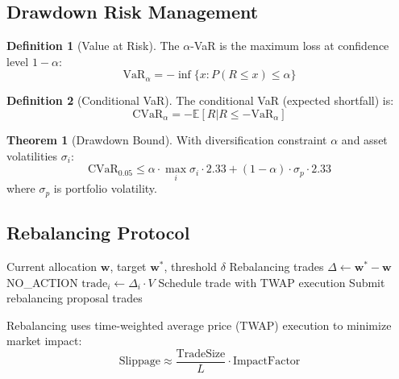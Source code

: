 \documentclass[11pt,a4paper]{article}
\theoremstyle{definition}
\newtheorem{definition}{Definition}[section]
\newtheorem{theorem}{Theorem}[section]
\theoremstyle{remark}
\begin{document}
\subsection{Drawdown Risk Management}

\begin{definition}[Value at Risk]
The $\alpha$-VaR is the maximum loss at confidence level $1 - \alpha$:
\begin{equation}
    \text{VaR}_\alpha = -\inf\{x : P(R \leq x) \leq \alpha\}
\end{equation}
\end{definition}

\begin{definition}[Conditional VaR]
The conditional VaR (expected shortfall) is:
\begin{equation}
    \text{CVaR}_\alpha = -\mathbb{E}[R | R \leq -\text{VaR}_\alpha]
\end{equation}
\end{definition}

\begin{theorem}[Drawdown Bound]
With diversification constraint $\alpha$ and asset volatilities $\sigma_i$:
\begin{equation}
    \text{CVaR}_{0.05} \leq \alpha \cdot \max_i \sigma_i \cdot 2.33 + (1 - \alpha) \cdot \sigma_p \cdot 2.33
\end{equation}
where $\sigma_p$ is portfolio volatility.
\end{theorem}

\subsection{Rebalancing Protocol}

\begin{algorithm}
\caption{Treasury Rebalancing}
\begin{algorithmic}[1]
\Require Current allocation $\mathbf{w}$, target $\mathbf{w}^*$, threshold $\delta$
\Ensure Rebalancing trades
\State $\Delta \gets \mathbf{w}^* - \mathbf{w}$
\If{$\|\Delta\|_\infty < \delta$}
    \State \Return NO\_ACTION
\EndIf
{}
    \State $\text{trade}_i \gets \Delta_i \cdot V$
    \State Schedule trade with TWAP execution
\EndFor
\State Submit rebalancing proposal
\State \Return trades
\end{algorithmic}
\end{algorithm}

Rebalancing uses time-weighted average price (TWAP) execution to minimize market impact:
\begin{equation}
    \text{Slippage} \approx \frac{\text{TradeSize}}{L} \cdot \text{ImpactFactor}
\end{equation}
\end{document}
